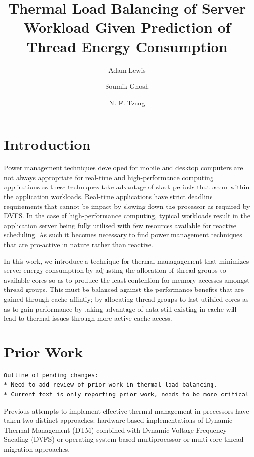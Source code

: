 \documentclass[times,12pt,onecolumn]{article}
\begin{document}
\title{Thermal Load Balancing of Server Workload Given Prediction of
  Thread Energy Consumption}
\author[]{Adam Lewis} 
\author[]{Soumik Ghosh} 
\author[]{N.-F. Tzeng}
\maketitle
\newtheorem{defn}{Definition}
\newtheorem{thm}{Theorem}
\thispagestyle{empty}
\doublespacing
\begin{abstract}

\end{abstract}

\section{Introduction}
\label{sec:Introduction}
Power management techniques developed for mobile and desktop computers
are not always appropriate for real-time and high-performance computing
applications as these techniques take advantage of slack periods that
occur within the application workloads. Real-time applications have
strict deadline requirements that cannot be impact by slowing down the
processor as required by DVFS. In the case of high-performance
computing, typical workloads result in the application server being
fully utilized with few resources available for reactive scheduling. As
such it becomes necessary to find power management techniques that are
pro-active in nature rather than reactive.

In this work, we introduce a technique for thermal
managagement that minimizes server energy consumption by adjusting the
allocation of thread groups to available cores so as to produce the
least contention for memory accesses amongst thread groups.   This must
be balanced against the performance benefits that are gained through
cache affintiy; by allocating thread groups to last utilzied cores as as
to gain performance by taking advantage of data still existing in cache
will lead to thermal issues through more active cache access.

\section{Prior Work}
\label{sec:prior}
\begin{verbatim}
Outline of pending changes:
* Need to add review of prior work in thermal load balancing.
* Current text is only reporting prior work, needs to be more critical
\end{verbatim}
Previous attempts to implement effective thermal management in
processors have taken two distinct approaches: hardware based
implementations of Dynamic Thermal Management (DTM) combined with Dynamic
Voltage-Frequency Sacaling (DVFS) or operating system based
multiprocessor or multi-core thread migration approaches.
\end{document}
